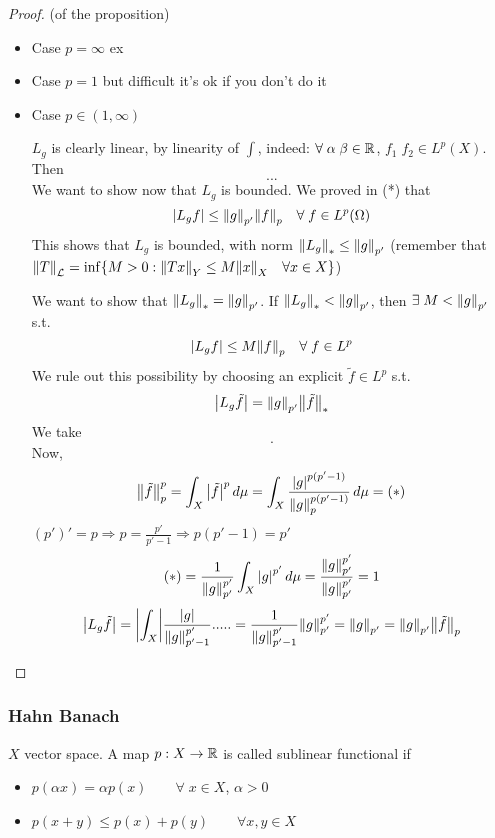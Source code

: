 \begin{proof}
    (of the proposition)
    \begin{itemize}
        \item Case \(p=\infty\) ex
        \item Case \(p=1\) but difficult it's ok if you don't do it
        \item Case \(p \in (1, \infty)\)
        
        \(L_g\) is clearly linear, by linearity of \(\int\), indeed:
        \(\forall \; \alpha \; \beta \in \mathbb{R}\), \(f_1 \; f_2 \in L^p(X)\). Then
        \[
            ...
        \]
        We want to show now that \(L_g \) is bounded. 
        We proved in (*) that 
        \[
            \abs{L_g f} \leq \norm{g}_{p'} \norm{f}_p \quad \forall \; f \in L^p(\Omega)
        \]
        This shows that \(L_g\) is bounded, with norm  \(\norm{L_g}_* \leq \norm{g}_{p'}\) (remember that \(\norm{T}_\mathcal{L} = \inf \{ M>0: \norm{Tx} _Y \leq M \norm{x}_X \quad \forall x \in X\} \))

        We want to show that \(\norm{L_g}_* = \norm{g}_{p'}\). If \(\norm{L_g}_* < \norm{g}_{p'}\), then \(\exists \; M < \norm{g}_{p'}\) s.t. 
        \[
            \abs{L_g f } \leq M \norm{f}_p \quad \forall \; f \in L^p
        \]
        We rule out this possibility by choosing an explicit \(\tilde{f} \in L^p \) s.t.
        \[
            \abs{L_g \tilde{f} } = \norm{g}_{p'} \norm{\tilde{f}}_*
        \]
        We take 
        \[
            .
        \]
        Now, 
        \[
            \norm{\tilde{f}}_p^p = \int_X \abs{\tilde{f}}^p \, d\mu = \int_X \frac{\abs{g}^{p(p'-1)}}{\norm{g}_p^{p(p'-1)}} \, d\mu = (*)
        \]
        \((p')' = p \Rightarrow p=\frac{p'}{p'-1} \Rightarrow p(p'-1) = p'\)
        \[
            (*) = \frac{1}{\norm{g}_{p'}^{p'}} \int_X \abs{g}^{p'} \, d\mu = \frac{\norm{g}_{p'}^{p'}}{\norm{g}_{p'}^{p'}} = 1
        \]    
        \[
            \abs{L_g \tilde{f}} = \abs{\int_X} \frac{\abs{g}}{\norm{g}_{p'-1}^{p'}} .....
            = \frac{1}{\norm{g}_{p'-1}^{p'}} \norm{g}_{p'}^{p'} = \norm{g}_{p'} = \norm{g}_{p'}\norm{\tilde{f}}_p
        \]
    \end{itemize}
\end{proof}

\subsubsection*{Hahn Banach}

\begin{definition}
    \(X\) vector space. A map \(p: X \to \mathbb{R}\) is called sublinear functional if 
    \begin{itemize}
        \item \(p(\alpha x) = \alpha p(x) \qquad \forall \; x \in X\), \(\alpha >0\)
        \item \(p(x+y) \leq p(x) + p(y) \qquad \forall x, y \in X\)  
    \end{itemize}
\end{definition}

